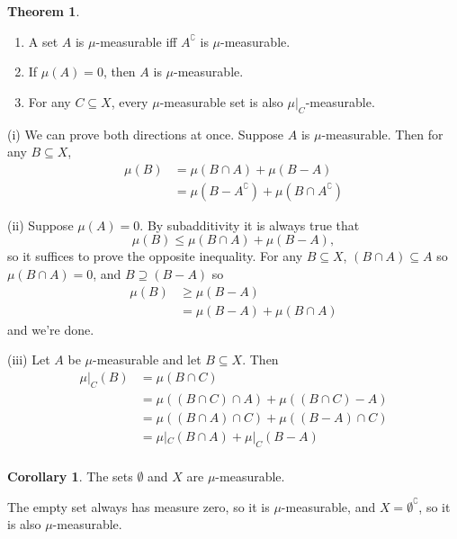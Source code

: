 \documentclass[a5paper]{article}
\makeatletter
\theoremstyle{definition}%
\newtheorem*{theorem*}{Theorem} %
\newtheorem*{corollary*}{Corollary}
\numberwithin{exercise}{section}
\theoremstyle{remark}%
\renewcommand{\measure}[1]{\mu\left(#1\right)}
\newcommand{\mumeasurable}{$\mu$-measurable}
\renewenvironment{proof}{{Proof.}}{\qed}
\renewenvironment{proof}[1][\proofname.]{\par
  \pushQED{\qed}%
  \normalfont \topsep6\p@\@plus6\p@\relax
  \trivlist
  \item[\hskip\labelsep
        \scshape
    #1\@addpunct{}]\ignorespaces
}{%
  \popQED\endtrivlist\@endpefalse
}
\makeatother
\begin{document}
\begin{highlight}
\begin{theorem*} \mbox{}
\begin{enumerate}[label=(\roman*)]
\item A set $A$ is \mumeasurable{} iff $A^\complement$ is \mumeasurable{}. 
\item If $\measure{A}=0$, then $A$ is \mumeasurable{}. 
\item For any $C\subseteq X$, every \mumeasurable{} set is also $\mu|_C$-measurable. 
\end{enumerate}
\end{theorem*}
\end{highlight}

\begin{proof} (i) We can prove both directions at once. Suppose $A$ is \mumeasurable{}. Then for any $B\subseteq X$, 
\[ \begin{array}{rl}
\measure{B}&= \measure{B\cap A} + \measure{B-A}\\
&= \measure{B-A^\complement} + \measure{B\cap A^\complement}
\end{array}\]
\qedwhite

(ii) Suppose $\measure{A}=0$. By subadditivity it is always true that $$\measure{B}\leq\measure{B\cap A} + \measure{B-A},$$ so it suffices to prove the opposite inequality. For any $B\subseteq X$, $(B\cap A) \subseteq A$ so $\measure{B\cap A}=0$, and $B\supseteq (B-A)$  so 
\[\begin{array}{rl}
\measure{B} &\geq \measure{B-A}\\
&= \measure{B-A} + \measure{B\cap A}
\end{array}\]
and we're done. \qedwhite

(iii) Let $A$ be \mumeasurable{} and let $B\subseteq X$. Then
\[\begin{array}{rl}
\mu|_C(B) &= \measure{B\cap C} \\ 
&= \measure{(B\cap C) \cap A} + \measure{(B\cap C)-A} \\
&= \measure{(B\cap A) \cap C} + \measure{(B-A)\cap C} \\
&= \mu|_C(B\cap A) + \mu|_C(B-A) \\

\end{array}\]
\end{proof}

\begin{corollary*}
The sets $\emptyset$ and $X$ are \mumeasurable{}. 
\end{corollary*}
\begin{proof}
The empty set always has measure zero, so it is \mumeasurable{}, and $X = \emptyset^\complement$, so it is also \mumeasurable{}. 
\end{proof}
\end{document}
